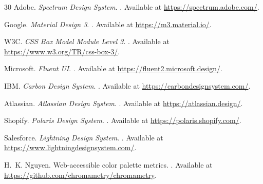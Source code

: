 \begin{thebibliography}{30}
Adobe.
\newblock \emph{Spectrum Design System}.
.
\newblock Available at \url{https://spectrum.adobe.com/}.

Google.
\newblock \emph{Material Design 3}.
.
\newblock Available at \url{https://m3.material.io/}.

W3C.
\newblock \emph{CSS Box Model Module Level 3}.
.
\newblock Available at \url{https://www.w3.org/TR/css-box-3/}.


Microsoft.
\newblock \emph{Fluent UI}.
.
\newblock Available at \url{https://fluent2.microsoft.design/}.

IBM.
\newblock \emph{Carbon Design System}.
.
\newblock Available at \url{https://carbondesignsystem.com/}.

Atlassian.
\newblock \emph{Atlassian Design System}.
.
\newblock Available at \url{https://atlassian.design/}.

Shopify.
\newblock \emph{Polaris Design System}.
.
\newblock Available at \url{https://polaris.shopify.com/}.

Salesforce.
\newblock \emph{Lightning Design System}.
.
\newblock Available at \url{https://www.lightningdesignsystem.com/}.


H.~K. Nguyen.
\newblock Web-accessible color palette metrics.
.
\newblock Available at \url{https://github.com/chromametry/chromametry}.

\end{thebibliography}
